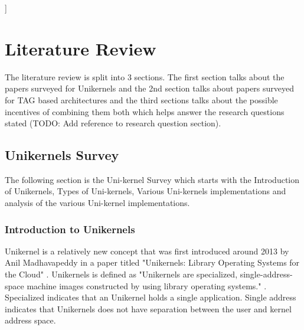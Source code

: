 ]%

\chapter{Literature Review}  %

\ifpdf
    \graphicspath{{LiteratureReview/Figs/Raster/}{LiteratureReview/Figs/PDF/}{LiteratureReview/Figs/}}
\else
    \graphicspath{{LiteratureReview/Figs/}{LiteratureReview/Figs/}}
\fi


The literature review is split into 3 sections. The first section talks about the papers surveyed 
for Unikernels and the 2nd section talks about papers surveyed for TAG based architectures and 
the third sections talks about the possible incentives of combining them both which helps 
answer the research questions stated (TODO: Add reference to research question section). 

\section[Unikernels]{Unikernels Survey}
The following section is the Uni-kernel Survey which starts 
with the Introduction of Unikernels, Types of Uni-kernels, 
Various Uni-kernels implementations and analysis 
of the various Uni-kernel implementations. 

\subsection{Introduction to Unikernels}
Unikernel is a relatively new concept that was first introduced around 2013 by Anil Madhavapeddy in a 
paper titled "Unikernels: Library Operating Systems for the Cloud" \cite{FirstUnikernelPaper}. Unikernels 
is defined as "Unikernels are specialized, single-address-space machine images constructed by using library 
operating systems." \cite{UnikernelDefinition}. Specialized indicates that an Unikernel holds a single application.
Single address indicates that Unikernels does not have separation between the user and kernel address 
space. 

